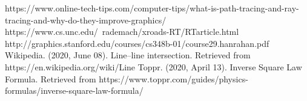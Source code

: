 \documentclass[conference]{IEEEtran}
\begin{document}
\begin{thebibliography}{00}
 https://www.online-tech-tips.com/computer-tips/what-is-path-tracing-and-ray-tracing-and-why-do-they-improve-graphics/
 https://www.cs.unc.edu/~rademach/xroads-RT/RTarticle.html
 http://graphics.stanford.edu/courses/cs348b-01/course29.hanrahan.pdf
 Wikipedia. (2020, June 08). Line–line intersection. Retrieved from https://en.wikipedia.org/wiki/Line%
 Toppr. (2020, April 13). Inverse Square Law Formula. Retrieved from https://www.toppr.com/guides/physics-formulas/inverse-square-law-formula/
\begin{comment}
\bibitem{b1} J. L\'azaro, \textit{Backtracking}, Departamento de Ciencias de la Computaci\'on, Universidad de Alcal\'a, n.d. Accessed on: Mar. 18, 2020. [Online]. Available: \url{ftp://www.cc.uah.es/pub/Alumnos/G_Ing_Informatica/Algoritmia_y_Complejidad/anteriores/Apuntes/08_Backtracking.pdf}
\bibitem{b2} “Nonogram”, n.d. Accessed on: Mar. 18, 2020. [Online]. Available: \url{https://www.definitions.net/definition/Nonogram}
\bibitem{b3}  C. Wu , D. Sun, L. Chen, K. Chen, C. Kuo, H. Kang and H. Lin, "An Efficient Approach to Solving Nonograms", \textit{IEEE Transactions On Computational Intelligence And AI In Games}, vol. 5. no. 3, Sept. 2013,  pp. 251-264. Accessed on: Mar. 18, 2020. [Online]. Available: \url{http://perpustakaan.unitomo.ac.id/repository/An Efficient Approach to Solving Nonograms.pdf}
\bibitem{b4} Tech With Tim, \textit{Python Sudoku Solver Tutorial with Backtracking p.2}, Apr. 4, 2019. Accessed on: Mar. 18, 2020. [Video file]. Available: \url{https://www.youtube.com/watch?v=lK4N8E6uNr4&t=844s}
\bibitem{b5} M. Richards, \textit{Backtracking Algorithms in MCPL using Bit Patterns and Recursion}, Computer Laboratory, University of Cambridge, Feb. 23, 2009. Accessed on: Mar. 18, 2020. [Online]. Available: \url{https://www.cl.cam.ac.uk/~mr10/backtrk.pdf}
\end{comment}
\end{thebibliography}
\end{document}
